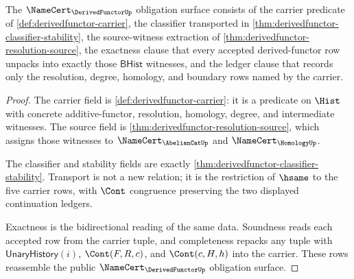 \begin{theorem}\label{thm:derivedfunctor-namecert-obligation-surface}
The $\NameCert_{\DerivedFunctorUp}$ obligation surface consists of the carrier predicate of \autoref{def:derivedfunctor-carrier}, the classifier transported in \autoref{thm:derivedfunctor-classifier-stability}, the source-witness extraction of \autoref{thm:derivedfunctor-resolution-source}, the exactness clause that every accepted derived-functor row unpacks into exactly those $\mathsf{BHist}$ witnesses, and the ledger clause that records only the resolution, degree, homology, and boundary rows named by the carrier.
\end{theorem}
\begin{proof}
The carrier field is \autoref{def:derivedfunctor-carrier}: it is a predicate on $\Hist$ with concrete additive-functor, resolution, homology, degree, and intermediate witnesses. The source field is \autoref{thm:derivedfunctor-resolution-source}, which assigns those witnesses to $\NameCert_{\AbelianCatUp}$ and $\NameCert_{\HomologyUp}$.

The classifier and stability fields are exactly \autoref{thm:derivedfunctor-classifier-stability}. Transport is not a new relation; it is the restriction of $\hsame$ to the five carrier rows, with $\Cont$ congruence preserving the two displayed continuation ledgers.

Exactness is the bidirectional reading of the same data. Soundness reads each accepted row from the carrier tuple, and completeness repacks any tuple with $\mathsf{UnaryHistory}(i)$, $\Cont(F,R,c)$, and $\Cont(c,H,h)$ into the carrier. These rows reassemble the public $\NameCert_{\DerivedFunctorUp}$ obligation surface.
\end{proof}

